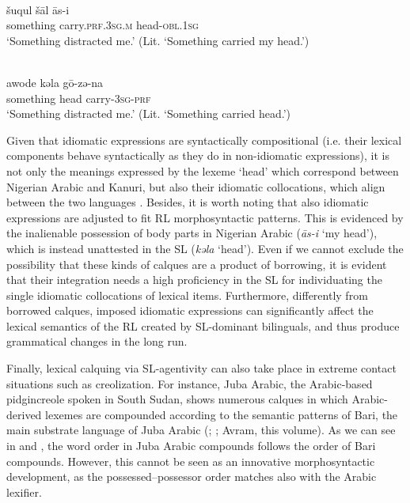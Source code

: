 \documentclass[output=paper]{langsci/langscibook}
\begin{document}
\ea\label{ex:key:distract}
\\
\gll   šuqul šāl {\R}ās-i\\
       something carry.\textsc{prf.3sg.m} head-\textsc{obl.1sg}\\
\glt   `Something distracted me.' (Lit. ‘Something carried my head.’)

\\
\gll   awode kǝla   gō-zǝ-na \\
       something head carry-\textsc{3sg-prf}\\
\glt   `Something distracted me.' (Lit. ‘Something carried head.’)
\z
\z

Given that idiomatic expressions are syntactically compositional (i.e. their lexical components behave syntactically as they do in non-idiomatic expressions), it is not only the meanings expressed by the lexeme ‘head’ which correspond between Nigerian Arabic and Kanuri, but also their idiomatic collocations, which align between the two languages \citep[157]{Owens2014}. Besides, it is worth noting that also idiomatic expressions are adjusted to fit RL morphosyntactic patterns. This is evidenced by the inalienable possession of body parts in Nigerian Arabic (\textit{{\R}ās-i} ‘my head’), which is instead unattested in the SL (\textit{kǝla} ‘head’). Even if we cannot exclude the possibility that these kinds of calques are a product of borrowing, it is evident that their integration needs a high proficiency in the SL for individuating the single idiomatic collocations of lexical items. Furthermore, differently from borrowed calques, imposed idiomatic expressions can significantly affect the lexical semantics of the RL created by SL-dominant bilinguals, and thus produce grammatical changes in the long run. 

Finally, lexical calquing via SL-agentivity can also take place in extreme contact situations such as creolization. For instance, Juba Arabic, the Arabic-based pidgincreole spoken in South Sudan, shows numerous calques in which Arabic-derived lexemes are compounded according to the semantic patterns of Bari, the main substrate language of Juba Arabic (\citealt{Nakao2012}; \citealt[50]{Manfredi2017}; Avram, this volume). As we can see in  and , the word order in Juba Arabic compounds follows the order of Bari compounds. However, this cannot be seen as an innovative morphosyntactic development, as the possessed–possessor order matches also with the Arabic lexifier. 
\end{document}
